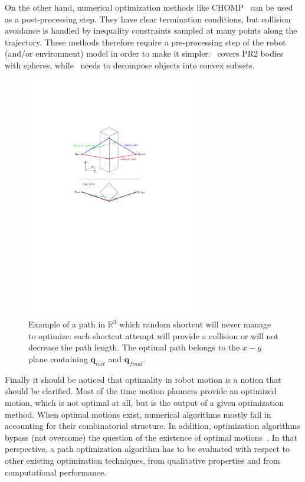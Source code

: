 \documentclass{tADR2e}
\newcommand\real{\mathbb{R}}
\newcommand\conf{\mathbf{q}}
\begin{document}
On the other hand, numerical
optimization methods like CHOMP~\cite{chompIjrr} can be used as a
post-processing step. They have clear termination conditions, but collision
avoidance is handled by inequality constraints sampled at many points along
the trajectory. These methods therefore require a pre-processing step of the
robot (and/or environment) model in order to make 
it simpler:~\cite{chompIjrr} covers PR2 bodies with spheres, 
while~\cite{convexOptimMotplan} needs to decompose objects into convex subsets.

\begin{figure}
	\centering
	\includegraphics[width=7.5cm]{decoupled_DOF_optimization.pdf}
	\caption{Example of a path in $\real^3$ which random shortcut will never manage to 
	optimize: each shortcut attempt will provide a collision or will not 
	decrease the path length. The optimal path belongs to the $x-y$ plane 
	containing $\conf_{init}$ and $\conf_{final}$.}
	\label{decoupled_DOF_optimization}
\end{figure}



Finally it should be noticed that optimality in robot motion is a notion that should be clarified. Most of the 
time motion planners provide an optimized motion, which is not optimal at all, but is the output of a given 
optimization method. When optimal motions exist, numerical
algorithms mostly fail in accounting for their combinatorial structure. In addition, optimization algorithms 
bypass (not overcome) the question of the existence of optimal motions~\cite{LaumondOptim}. In that perspective, 
a path optimization algorithm has to be evaluated with respect to other existing optimization techniques, 
from qualitative properties and from computational performance.
\end{document}
